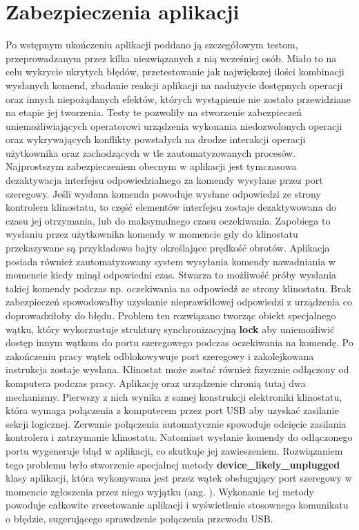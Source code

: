 \section{Zabezpieczenia aplikacji}

Po wstępnym ukończeniu aplikacji poddano ją szczegółowym testom, przeprowadzanym przez kilka niezwiązanych z nią wcześniej osób. Miało to na celu wykrycie ukrytych błędów, przetestowanie jak największej ilości kombinacji wysłanych komend, zbadanie reakcji aplikacji na nadużycie dostępnych operacji oraz innych niepożądanych efektów, których wystąpienie nie zostało przewidziane na etapie jej tworzenia. Testy te pozwoliły na stworzenie zabezpieczeń uniemożliwiających operatorowi urządzenia wykonania niedozwolonych operacji oraz wykrywających konflikty powstałych na drodze interakcji operacji użytkownika oraz zachodzących w tle zautomatyzowanych procesów. Najprostszym zabezpieczeniem obecnym w aplikacji jest tymczasowa dezaktywacja interfejsu odpowiedzialnego za komendy wysyłane przez port szeregowy. Jeśli wysłana komenda powoduje wysłane odpowiedzi ze strony kontrolera klinostatu, to część elementów interfejsu zostaje dezaktywowana do czasu jej otrzymania, lub do maksymalnego czasu oczekiwania. Zapobiega to wysłaniu przez użytkownika komendy w momencie gdy do klinostatu przekazywane są przykładowo bajty określające prędkość obrotów. Aplikacja posiada również zautomatyzowany system wysyłania komendy nawadniania w momencie kiedy minął odpowiedni czas. Stwarza to możliwość próby wysłania takiej komendy podczas np. oczekiwania na odpowiedź ze strony klinostatu. Brak zabezpieczeń spowodowałby uzyskanie nieprawidłowej odpowiedzi z urządzenia co doprowadziłoby do błędu. Problem ten rozwiązano tworząc obiekt specjalnego wątku, który wykorzustuje strukturę synchronizacyjną \textbf{lock} aby uniemożliwić dostęp innym wątkom do portu szeregowego podczas oczekiwania na komendę. Po zakończeniu pracy wątek odblokowywuje port szeregowy i zakolejkowana instrukcja zostaje wysłana. Klinostat może zostać również fizycznie odłączony od komputera podczas pracy. Aplikację oraz urządzenie chronią tutaj dwa mechanizmy. Pierwszy z nich wynika z samej konstrukcji elektroniki klinostatu, która wymaga połączenia z komputerem przez port USB aby uzyskać zasilanie sekcji logicznej. Zerwanie połączenia automatycznie spowoduje odcięcie zasilania kontrolera i zatrzymanie klinostatu. Natomiast wysłanie komendy do odłączonego portu wygeneruje błąd w aplikacji, co skutkuje jej zawieszeniem. Rozwiązaniem tego problemu było stworzenie specjalnej metody \textbf{device\_likely\_unplugged} klasy aplikacji, która wykonywana jest przez wątek obsługujący port szeregowy w momencie zgłoszenia przez niego wyjątku (ang. ). Wykonanie tej metody powoduje całkowite zresetowanie aplikacji i wyświetlenie stosownego komunikatu o błędzie, sugerującego sprawdzenie połączenia przewodu USB.

